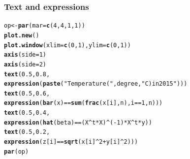 \documentclass[12pt]{beamer}\usepackage[]{graphicx}\usepackage[]{color}
\makeatletter
\newcommand{\hlnum}[1]{\textcolor[rgb]{0.686,0.059,0.569}{#1}}%
\newcommand{\hlstr}[1]{\textcolor[rgb]{0.192,0.494,0.8}{#1}}%
\newcommand{\hlopt}[1]{\textcolor[rgb]{0,0,0}{#1}}%
\newcommand{\hlstd}[1]{\textcolor[rgb]{0.345,0.345,0.345}{#1}}%
\newcommand{\hlkwb}[1]{\textcolor[rgb]{0.69,0.353,0.396}{#1}}%
\newcommand{\hlkwc}[1]{\textcolor[rgb]{0.333,0.667,0.333}{#1}}%
\newcommand{\hlkwd}[1]{\textcolor[rgb]{0.737,0.353,0.396}{\textbf{#1}}}%
\newenvironment{kframe}{%
 \def\at@end@of@kframe{}%
 \ifinner\ifhmode%
  \def\at@end@of@kframe{\end{minipage}}%
  \begin{minipage}{\columnwidth}%
 \fi\fi%
 \def\FrameCommand##1{\hskip\@totalleftmargin \hskip-\fboxsep
 \colorbox{shadecolor}{##1}\hskip-\fboxsep
     \hskip-\linewidth \hskip-\@totalleftmargin \hskip\columnwidth}%
 \MakeFramed {\advance\hsize-\width
   \@totalleftmargin\z@ \linewidth\hsize
   \@setminipage}}%
 {\par\unskip\endMakeFramed%
 \at@end@of@kframe}
\newenvironment{knitrout}{}{} %
\makeatother
\begin{document}
\begin{frame}[fragile]
\frametitle{Text and expressions}

\begin{knitrout}\footnotesize
{}\color{fgcolor}\begin{kframe}
\begin{alltt}
\hlstd{op} \hlkwb{<-} \hlkwd{par}\hlstd{(}\hlkwc{mar} \hlstd{=} \hlkwd{c}\hlstd{(}\hlnum{4}\hlstd{,} \hlnum{4}\hlstd{,} \hlnum{1}\hlstd{,} \hlnum{1}\hlstd{))}
\hlkwd{plot.new}\hlstd{()}
\hlkwd{plot.window}\hlstd{(}\hlkwc{xlim} \hlstd{=} \hlkwd{c}\hlstd{(}\hlnum{0}\hlstd{,} \hlnum{1}\hlstd{),} \hlkwc{ylim} \hlstd{=} \hlkwd{c}\hlstd{(}\hlnum{0}\hlstd{,} \hlnum{1}\hlstd{))}
\hlkwd{axis}\hlstd{(}\hlkwc{side} \hlstd{=} \hlnum{1}\hlstd{)}
\hlkwd{axis}\hlstd{(}\hlkwc{side} \hlstd{=} \hlnum{2}\hlstd{)}
\hlkwd{text}\hlstd{(}\hlnum{0.5}\hlstd{,} \hlnum{0.8}\hlstd{,}
     \hlkwd{expression}\hlstd{(}\hlkwd{paste}\hlstd{(}\hlstr{"Temperature ("}\hlstd{, degree,} \hlstr{"C) in 2015"}\hlstd{)))}
\hlkwd{text}\hlstd{(}\hlnum{0.5}\hlstd{,} \hlnum{0.6}\hlstd{,}
     \hlkwd{expression}\hlstd{(}\hlkwd{bar}\hlstd{(x)} \hlopt{==} \hlkwd{sum}\hlstd{(}\hlkwd{frac}\hlstd{(x[i], n), i}\hlopt{==}\hlnum{1}\hlstd{, n)))}
\hlkwd{text}\hlstd{(}\hlnum{0.5}\hlstd{,} \hlnum{0.4}\hlstd{,}
     \hlkwd{expression}\hlstd{(}\hlkwd{hat}\hlstd{(beta)} \hlopt{==} \hlstd{(X}\hlopt{^}\hlstd{t} \hlopt{*} \hlstd{X)}\hlopt{^}\hlstd{(}\hlopt{-}\hlnum{1}\hlstd{)} \hlopt{*} \hlstd{X}\hlopt{^}\hlstd{t} \hlopt{*} \hlstd{y))}
\hlkwd{text}\hlstd{(}\hlnum{0.5}\hlstd{,} \hlnum{0.2}\hlstd{,}
     \hlkwd{expression}\hlstd{(z[i]} \hlopt{==} \hlkwd{sqrt}\hlstd{(x[i]}\hlopt{^}\hlnum{2} \hlopt{+} \hlstd{y[i]}\hlopt{^}\hlnum{2}\hlstd{)))}
\hlkwd{par}\hlstd{(op)}
\end{alltt}
\end{kframe}
\end{knitrout}

\end{frame}

\end{document}
